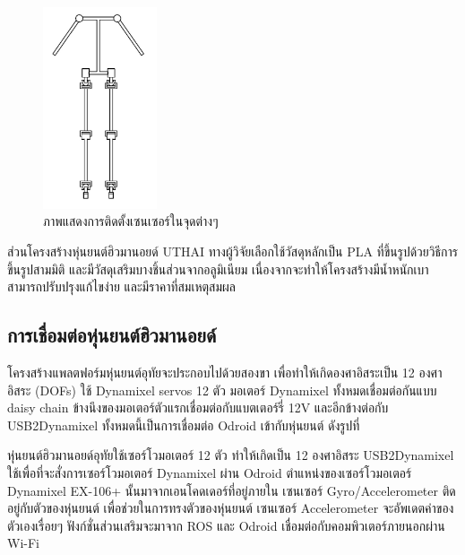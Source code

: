 \begin{figure}[ht]
    \centering
    \includegraphics[width=0.3\textwidth]{chapter3/images/uthai_structure2.jpeg}
    \caption{ภาพแสดงการติดตั้งเซนเซอร์ในจุดต่างๆ}
    \label{fig:uthai_structure2}
\end{figure}

ส่วนโครงสร้างหุ่นยนต์ฮิวมานอยด์ UTHAI ทางผู้วิจัยเลือกใช้วัสดุหลักเป็น PLA ที่ขึ้นรูปด้วยวิธีการขึ้นรูปสามมิติ
และมีวัสดุเสริมบางชิ้นส่วนจากอลูมิเนียม เนื่องจากจะทำให้โครงสร้างมีน้ำหนักเบา สามารถปรับปรุงแก้ไขง่าย และมีราคาที่สมเหตุสมผล




\subsection{การเชื่อมต่อหุ่นยนต์ฮิวมานอยด์}
โครงสร้างแพลตฟอร์มหุ่นยนต์อุทัยจะประกอบไปด้วยสองขา เพื่อทำให้เกิดองศาอิสระเป็น 12 องศาอิสระ
(DOFs) ใช้ Dynamixel servos 12 ตัว มอเตอร์ Dynamixel ทั้งหมดเชื่อมต่อกันแบบ daisy chain
ข้างนึงของมอเตอร์ตัวแรกเชื่อมต่อกับแบตเตอร์รี่ 12V และอีกข้างต่อกับ USB2Dynamixel
ทั้งหมดนี้เป็นการเชื่อมต่อ Odroid เข้ากับหุ่นยนต์ ดังรูปที่ %


หุ่นยนต์ฮิวมานอยด์อุทัยใช้เซอร์โวมอเตอร์ 12 ตัว ทำให้เกิดเป็น 12 องศาอิสระ
USB2Dynamixel ใช้เพื่อที่จะสั่งการเซอร์โวมอเตอร์ Dynamixel ผ่าน Odroid
ตำแหน่งของเซอร์โวมอเตอร์ Dynamixel EX-106+ นั้นมาจากเอนโคดเดอร์ที่อยู่ภายใน
เซนเซอร์ Gyro/Accelerometer ติดอยู่กับตัวของหุ่นยนต์ เพื่อช่วยในการทรงตัวของหุ่นยนต์
เซนเซอร์ Accelerometer จะอัพเดตค่าของตัวเองเรื่อยๆ ฟังก์ชั่นส่วนเสริมจะมาจาก ROS
และ Odroid เชื่อมต่อกับคอมพิวเตอร์ภายนอกผ่าน Wi-Fi

